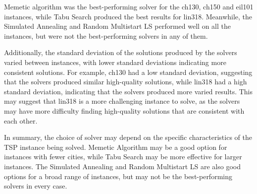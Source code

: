 \documentclass[conference]{IEEEtran}
\begin{document}
Memetic algorithm was the best-performing solver for the ch130, ch150 and eil101 instances, while Tabu Search produced the best results for lin318. Meanwhile, the Simulated Annealing and Random Multistart LS performed well on all the instances, but were not the best-performing solvers in any of them.

Additionally, the standard deviation of the solutions produced by the solvers varied between instances, with lower standard deviations indicating more consistent solutions. For example, ch130 had a low standard deviation, suggesting that the solvers produced similar high-quality solutions, while lin318 had a high standard deviation, indicating that the solvers produced more varied results. This may suggest that lin318 is a more challenging instance to solve, as the solvers may have more difficulty finding high-quality solutions that are consistent with each other.

In summary, the choice of solver may depend on the specific characteristics of the TSP instance being solved. Memetic Algorithm may be a good option for instances with fewer cities, while Tabu Search may be more effective for larger instances. The Simulated Annealing and Random Multistart LS are also good options for a broad range of instances, but may not be the best-performing solvers in every case.
\end{document}
